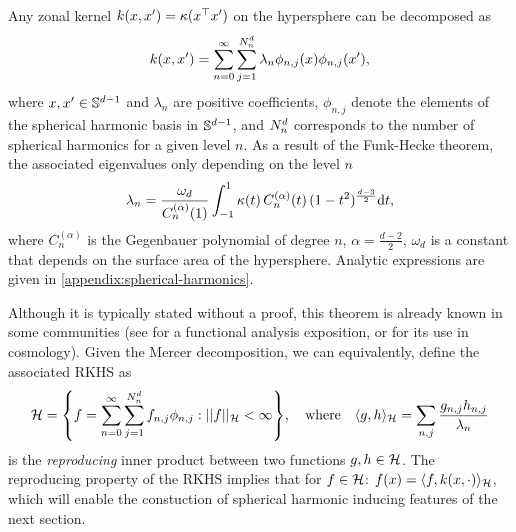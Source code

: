 \begin{theorem}
Any zonal kernel $k(x, x') = \kappa(x^{\top} x')$ on the hypersphere can be decomposed as
\begin{equation}
\label{eq:kernel-form}
    k(x, x') = \sum_{n=0}^{\infty} \sum_{j=1}^{N^d_n} \lambda_{n} \phi_{n,j}(x) \phi_{n,j}(x'),
\end{equation}
where $x,x' \in \mathbb{S}^{d-1}$ and $\lambda_{n}$ are positive coefficients, $\phi_{n,j}$ denote the elements of the spherical harmonic basis in $\mathbb{S}^{d-1}$, and $N^d_n$ corresponds to the number of spherical harmonics for a given level $n$. As a result of the Funk-Hecke theorem, the associated eigenvalues only depending on the level $n$
\begin{equation}
    \label{eq:compute-eigenvalues}
        \lambda_{n} = \frac{\omega_{d}}{C_n^{(\alpha)}(1)} \int_{-1}^1 \kappa(t)\,C_n^{(\alpha)}(t)\,(1 - t^2)^{\frac{d-3}{2}} \mathrm{d}{t},
\end{equation} 
where $C_n^{(\alpha)}$ is the Gegenbauer polynomial of degree $n$, $\alpha = \frac{d-2}{2}$, $\omega_d$ is a constant that depends on the surface area of the hypersphere. Analytic expressions are given in \cref{appendix:spherical-harmonics}.
\end{theorem}
Although it is typically stated without a proof, this theorem is already known in some communities (see \citet{wendland2005} for a functional analysis exposition, or \citet{peacock1999cosmological} for its use in cosmology). Given the Mercer decomposition, we can equivalently, define the associated RKHS as
\begin{equation}
    \label{eq:inner-product-rkhs}
    \rkhs = \left\{
    f = 
    \sum_{n=0}^\infty \sum_{j=1}^{\dnumharmonicsforlevel} {f}_{n,j} \sh_{n, j}:
    \norm{f}_{\rkhs} < \infty
    \right\},
    \quad\text{where}\quad
    \langle g, h \rangle_{\rkhs} = 
    \sum_{n,j}
            \frac{{g}_{n, j} {h}_{n, j}}{\lambda_{n}}
\end{equation}
is the \emph{reproducing} inner product between two functions $g,h \in {\mathcal{H}}$. The reproducing property of the RKHS implies that for $f \in {\mathcal{H}}$: $f(x) = \langle f, k(x, \cdot) \rangle_{{\mathcal{H}}}$, which will enable the constuction of spherical harmonic inducing features of the next section.


